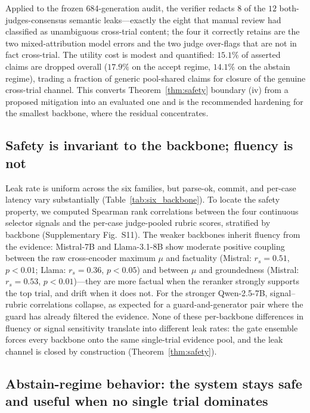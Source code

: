 \documentclass[11pt]{article}
\begin{document}
Applied to the frozen 684-generation audit, the verifier redacts $8$ of the $12$ both-judges-consensus semantic leaks---exactly the eight that manual review had classified as unambiguous cross-trial content; the four it correctly retains are the two mixed-attribution model errors and the two judge over-flags that are not in fact cross-trial. The utility cost is modest and quantified: $15.1\%$ of asserted claims are dropped overall ($17.9\%$ on the accept regime, $14.1\%$ on the abstain regime), trading a fraction of generic pool-shared claims for closure of the genuine cross-trial channel. This converts Theorem~\ref{thm:safety} boundary (iv) from a proposed mitigation into an evaluated one and is the recommended hardening for the smallest backbone, where the residual concentrates.

\subsection{Safety is invariant to the backbone; fluency is not}
\label{sec:results_backbone_gate}

Leak rate is uniform across the six families, but parse-ok, commit, and per-case latency vary substantially (Table~\ref{tab:six_backbone}). To locate the safety property, we computed Spearman rank correlations between the four continuous selector signals and the per-case judge-pooled rubric scores, stratified by backbone (Supplementary Fig.~S11). The weaker backbones inherit fluency from the evidence: Mistral-7B and Llama-3.1-8B show moderate positive coupling between the raw cross-encoder maximum $\mu$ and factuality (Mistral: $r_s = 0.51$, $p < 0.01$; Llama: $r_s = 0.36$, $p < 0.05$) and between $\mu$ and groundedness (Mistral: $r_s = 0.53$, $p < 0.01$)---they are more factual when the reranker strongly supports the top trial, and drift when it does not. For the stronger Qwen-2.5-7B, signal--rubric correlations collapse, as expected for a guard-and-generator pair where the guard has already filtered the evidence. None of these per-backbone differences in fluency or signal sensitivity translate into different leak rates: the gate ensemble forces every backbone onto the same single-trial evidence pool, and the leak channel is closed by construction (Theorem~\ref{thm:safety}).

\subsection{Abstain-regime behavior: the system stays safe and useful when no single trial dominates}
\label{sec:results_abstain}
\end{document}
